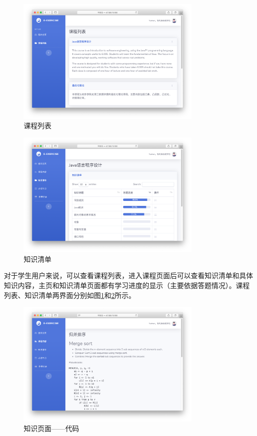 \documentclass{nwafucoursepaper}
\begin{document}
\begin{figure}[htp]
  \centering
  \includegraphics[width=0.8\textwidth]{subject_list.png}
  \caption{课程列表}
  \label{subject_list}
\end{figure}

\begin{figure}[htp]
  \centering
  \includegraphics[width=0.8\textwidth]{knowledge_list.png}
  \caption{知识清单}
  \label{knowledge_list}
\end{figure}

对于学生用户来说，可以查看课程列表，进入课程页面后可以查看知识清单和具体知识内容，主页和知识清单页面都有学习进度的显示（主要依据答题情况）。课程列表、知识清单两界面分别如图\ref{subject_list}和\ref{knowledge_list}所示。

\begin{figure}[htp]
  \centering
  \includegraphics[width=0.8\textwidth]{knowledge_code.png}
  \caption{知识页面——代码}
  \label{knowledge_code}
\end{figure}
\end{document}
